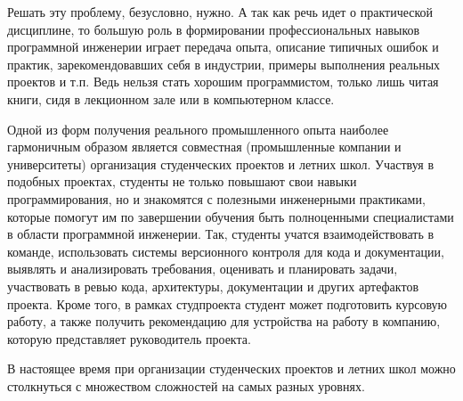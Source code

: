 \documentclass[a5paper]{article}
\begin{document}
Решать эту проблему, безусловно, нужно. А так как речь идет о практической дисциплине, то большую роль в формировании профессиональных навыков программной инженерии играет передача опыта, описание типичных ошибок и практик, зарекомендовавших себя в индустрии, примеры выполнения реальных проектов и т.п. Ведь нельзя стать хорошим программистом, только лишь читая книги, сидя в лекционном зале или в компьютерном классе. 

Одной из форм получения реального промышленного опыта наиболее гармоничным образом является совместная (промышленные компании и университеты) организация студенческих проектов и летних школ. Участвуя в подобных проектах, студенты не только повышают свои навыки программирования, но и знакомятся с полезными инженерными практиками, которые помогут им по завершении обучения быть полноценными специалистами в области программной инженерии. Так, студенты учатся взаимодействовать в команде, использовать системы версионного контроля для кода и документации, выявлять и анализировать требования, оценивать и планировать задачи, участвовать в ревью кода, архитектуры, документации и других артефактов проекта. Кроме того, в рамках студпроекта студент может подготовить курсовую работу, а также получить рекомендацию для устройства на работу в компанию, которую представляет руководитель проекта. 

В настоящее время при организации студенческих проектов и летних школ можно столкнуться с множеством сложностей на самых разных уровнях. 
\end{document}
